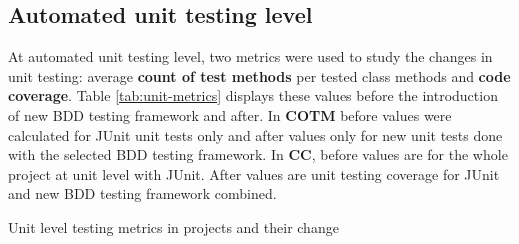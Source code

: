 \subsection{Automated unit testing level}
\label{subsub:unit-level-metrics}
At automated unit testing level, two metrics were used to study the changes in unit testing: average \textbf{count of test methods}
per tested class methods and \textbf{code coverage}. Table \ref{tab:unit-metrics} displays these values before the introduction
of new BDD testing framework and after. In \textbf{COTM} before values were calculated for JUnit unit tests only and after
values only for new unit tests done with the selected BDD testing framework. In \textbf{CC}, before values are for the
whole project at unit level with JUnit. After values are unit testing coverage for JUnit and new BDD testing framework
combined.

{\renewcommand{\arraystretch}{1.3}
\begin{table}[H]
        \caption {Unit level testing metrics in projects and their change} \label{tab:unit-metrics}
        \caption*{* = Value in parenthesis is without calculating data-driven tests sum}
\end{table}
}

